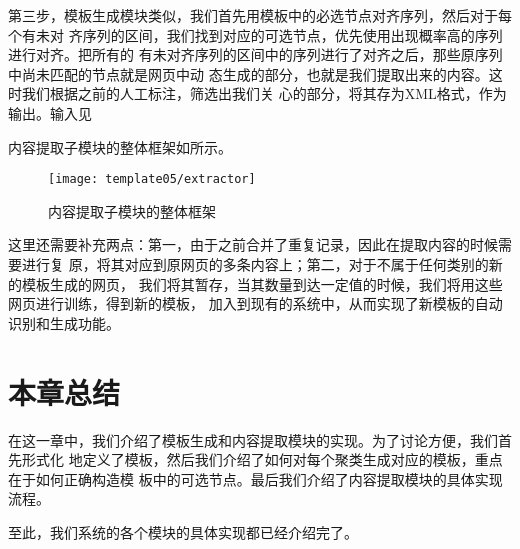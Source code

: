 第三步，模板生成模块类似，我们首先用模板中的必选节点对齐序列，然后对于每个有未对
齐序列的区间，我们找到对应的可选节点，优先使用出现概率高的序列进行对齐。把所有的
有未对齐序列的区间中的序列进行了对齐之后，那些原序列中尚未匹配的节点就是网页中动
态生成的部分，也就是我们提取出来的内容。这时我们根据之前的人工标注，筛选出我们关
心的部分，将其存为XML格式，作为输出。输入见%

内容提取子模块的整体框架如所示。
\begin{figure}
  \centering
  \texttt{[image: template05/extractor]}
  \caption{内容提取子模块的整体框架}
  \label{template:fig:extractor}
\end{figure}

这里还需要补充两点：第一，由于之前合并了重复记录，因此在提取内容的时候需要进行复
原，将其对应到原网页的多条内容上；第二，对于不属于任何类别的新的模板生成的网页，
我们将其暂存，当其数量到达一定值的时候，我们将用这些网页进行训练，得到新的模板，
加入到现有的系统中，从而实现了新模板的自动识别和生成功能。

\section{本章总结}
\label{sec:summarytemplate}
在这一章中，我们介绍了模板生成和内容提取模块的实现。为了讨论方便，我们首先形式化
地定义了模板，然后我们介绍了如何对每个聚类生成对应的模板，重点在于如何正确构造模
板中的可选节点。最后我们介绍了内容提取模块的具体实现流程。

至此，我们系统的各个模块的具体实现都已经介绍完了。

